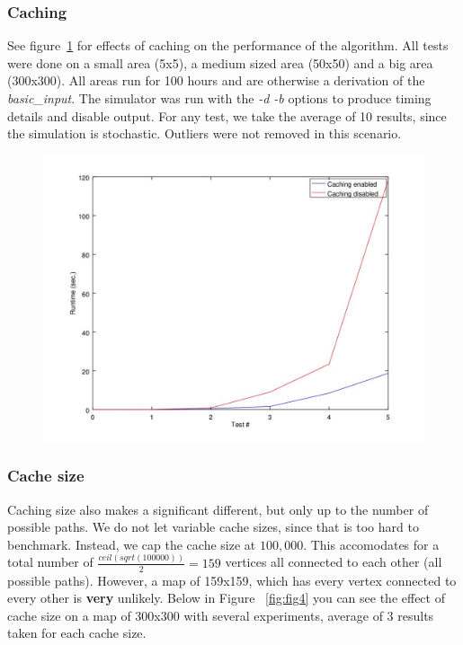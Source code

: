 \documentclass{article}
\begin{document}
	\subsubsection{Caching}
		See figure~\ref{fig:fig3} for effects of caching on the performance of the algorithm. All tests were done on a small area (5x5), a medium sized area (50x50)
		and a big area (300x300). All areas run for 100 hours and are otherwise a derivation of the \textit{basic\_input}. The simulator was run with the \textit{-d -b} options
		to produce timing details and disable output. For any test, we take the average of 10 results, since the simulation is stochastic. Outliers were not removed
		in this scenario.

		\begin{figure}[H]
		\centering
			\includegraphics[width=.8\columnwidth]{resources/caching_performance.jpg}
			\label{fig:fig3}
		\end{figure}

		\subsubsection{Cache size}
			Caching size also makes a significant different, but only up to the number of possible paths. We do not let variable cache sizes,
			since that is too hard to benchmark. Instead, we cap the cache size at $100,000$. This accomodates for a total number of $\frac{ceil(sqrt(100000))}{2} = 159$ vertices
			all connected to each other (all possible paths). However, a map of 159x159, which has every vertex connected to every other is \textbf{very} unlikely. Below in Figure ~\ref{fig:fig4}
			you can see the effect of cache size on a map of 300x300 with several experiments, average of 3 results taken for each cache size.
		
\end{document}

